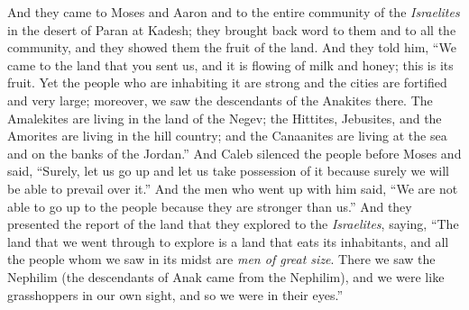 \begin{biblechapter}
\verse And they came to Moses and Aaron and to the entire community of the \textit{Israelites} in the desert of Paran at Kadesh; they brought back word to them and to all the community, and they showed them the fruit of the land.
\verse And they told him, “We came to the land that you sent us, and it is flowing of milk and honey; this is its fruit.
\verse Yet the people who are inhabiting it are strong and the cities are fortified and very large; moreover, we saw the descendants of the Anakites there.
\verse The Amalekites are living in the land of the Negev; the Hittites, Jebusites, and the Amorites are living in the hill country; and the Canaanites are living at the sea and on the banks of the Jordan.”
\verse And Caleb silenced the people before Moses and said, “Surely, let us go up and let us take possession of it because surely we will be able to prevail over it.”
\verse And the men who went up with him said, “We are not able to go up to the people because they are stronger than us.”
\verse And they presented the report of the land that they explored to the \textit{Israelites}, saying, “The land that we went through to explore is a land that eats its inhabitants, and all the people whom we saw in its midst are \textit{men of great size}.
\verse There we saw the Nephilim (the descendants of Anak came from the Nephilim), and we were like grasshoppers in our own sight, and so we were in their eyes.”
\end{biblechapter}

